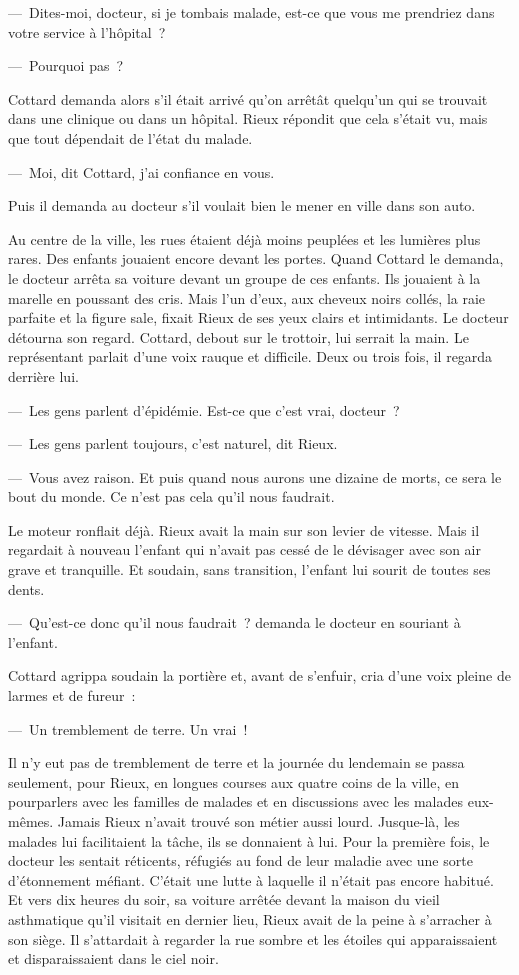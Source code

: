 \documentclass[french,twoside]{book} %
\begin{document}
— Dites-moi, docteur, si je tombais malade, est-ce que vous me prendriez dans votre service à l’hôpital ?\par
— Pourquoi pas ?\par
Cottard demanda alors s’il était arrivé qu’on arrêtât quelqu’un qui se trouvait dans une clinique ou dans un hôpital. Rieux répondit que cela s’était vu, mais que tout dépendait de l’état du malade.\par
— Moi, dit Cottard, j’ai confiance en vous.\par
Puis il demanda au docteur s’il voulait bien le mener en ville dans son auto.\par
Au centre de la ville, les rues étaient déjà moins peuplées et les lumières plus rares. Des enfants jouaient encore devant les portes. Quand Cottard le demanda, le docteur arrêta sa voiture devant un groupe de ces enfants. Ils jouaient à la marelle en poussant des cris. Mais l’un d’eux, aux cheveux noirs collés, la raie parfaite et la figure sale, fixait Rieux de ses yeux clairs et intimidants. Le docteur détourna son regard. Cottard, debout sur le trottoir, lui serrait la main. Le représentant parlait d’une voix rauque et difficile. Deux ou trois fois, il regarda derrière lui.\par
— Les gens parlent d’épidémie. Est-ce que c’est vrai, docteur ?\par
— Les gens parlent toujours, c’est naturel, dit Rieux.\par
— Vous avez raison. Et puis quand nous aurons une dizaine de morts, ce sera le bout du monde. Ce n’est pas cela qu’il nous faudrait.\par
Le moteur ronflait déjà. Rieux avait la main sur son levier de vitesse. Mais il regardait à nouveau l’enfant qui n’avait pas cessé de le dévisager avec son air grave et tranquille. Et soudain, sans transition, l’enfant lui sourit de toutes ses dents.\par
— Qu’est-ce donc qu’il nous faudrait ? demanda le docteur en souriant à l’enfant.\par
Cottard agrippa soudain la portière et, avant de s’enfuir, cria d’une voix pleine de larmes et de fureur :\par
— Un tremblement de terre. Un vrai !\par
Il n’y eut pas de tremblement de terre et la journée du lendemain se passa seulement, pour Rieux, en longues courses aux quatre coins de la ville, en pourparlers avec les familles de malades et en discussions avec les malades eux-mêmes. Jamais Rieux n’avait trouvé son métier aussi lourd. Jusque-là, les malades lui facilitaient la tâche, ils se donnaient à lui. Pour la première fois, le docteur les sentait réticents, réfugiés au fond de leur maladie avec une sorte d’étonnement méfiant. C’était une lutte à laquelle il n’était pas encore habitué. Et vers dix heures du soir, sa voiture arrêtée devant la maison du vieil asthmatique qu’il visitait en dernier lieu, Rieux avait de la peine à s’arracher à son siège. Il s’attardait à regarder la rue sombre et les étoiles qui apparaissaient et disparaissaient dans le ciel noir.\par
\end{document}
